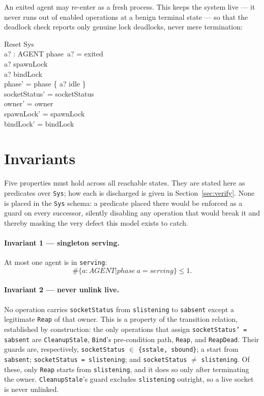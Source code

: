 \documentclass[a4paper,10pt,fleqn]{article}
\begin{document}
An exited agent may re-enter as a fresh process.  This keeps the system
live --- it never runs out of enabled operations at a benign terminal
state --- so that the deadlock check reports only genuine lock
deadlocks, never mere termination:

\begin{schema}{Reset}
  \Delta Sys \\
  a? : AGENT
\where
  phase~a? = exited \\
  a? \notin spawnLock \\
  a? \notin bindLock \\
  phase' = phase \oplus \{ a? \mapsto idle \} \\
  socketStatus' = socketStatus \\
  owner' = owner \\
  spawnLock' = spawnLock \\
  bindLock' = bindLock
\end{schema}

\section{Invariants}
\label{sec:inv}

Five properties must hold across all reachable states.  They are stated
here as predicates over \texttt{Sys}; how each is discharged is given in
Section~\ref{sec:verify}.  None is placed in the \texttt{Sys} schema: a
predicate placed there would be enforced as a guard on every successor,
silently disabling any operation that would break it and thereby masking
the very defect this model exists to catch.

\paragraph{Invariant 1 --- singleton serving.}
At most one agent is in \texttt{serving}:
\[
  \# \{ a : AGENT | phase~a = serving \} \leq 1.
\]

\paragraph{Invariant 2 --- never unlink live.}
No operation carries \texttt{socketStatus} from \texttt{slistening} to
\texttt{sabsent} except a legitimate \texttt{Reap} of that owner.  This is
a property of the transition relation, established by construction: the
only operations that assign \texttt{socketStatus' = sabsent} are
\texttt{CleanupStale}, \texttt{Bind}'s pre-condition path, \texttt{Reap},
and \texttt{ReapDead}.  Their guards are, respectively,
\texttt{socketStatus} $\in$ \texttt{\{sstale, sbound\}}; a start from
\texttt{sabsent}; \texttt{socketStatus = slistening}; and
\texttt{socketStatus} $\neq$ \texttt{slistening}.  Of
these, only \texttt{Reap} starts from \texttt{slistening}, and it does so
only after terminating the owner.  \texttt{CleanupStale}'s guard
excludes \texttt{slistening} outright, so a live socket is never
unlinked.
\end{document}
